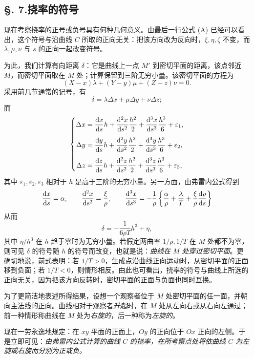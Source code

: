 \subsection*{§. 7.\quad 挠率的符号}
现在考察挠率的正号或负号具有何种几何意义。由最后一行公式 (A) 已经可以看出，这个符号与沿曲线 \(C\) 所取的正向无关：把该方向改为反向时，\(\xi,\eta,\zeta\) 不变，而 \(\lambda,\mu,\nu\) 与 \(s\) 的正向一起改变符号。

为此，我们计算有向距离 \(\delta\)：它是曲线上一点 \(M'\) 到密切平面的距离，该点邻近 \(M\)，而密切平面取在 \(M\) 处；计算保留到三阶无穷小量。该密切平面的方程为
\[
(X-x)\lambda+(Y-y)\mu+(Z-z)\nu=0.
\]
采用前几节通常的记号，有
\[
\delta=\lambda\Delta x+\mu\Delta y+\nu\Delta z;
\]
而
\[
\left\{
\begin{aligned}
\Delta x&=\frac{\mathrm{d} x}{\mathrm{d} s}h+\frac{\mathrm{d}^2x}{\mathrm{d} s^2}\frac{h^2}{2}+\frac{\mathrm{d}^3x}{\mathrm{d} s^3}\frac{h^3}{6}+\varepsilon_1,\\[0.4em]
\Delta y&=\frac{\mathrm{d} y}{\mathrm{d} s}h+\frac{\mathrm{d}^2y}{\mathrm{d} s^2}\frac{h^2}{2}+\frac{\mathrm{d}^3y}{\mathrm{d} s^3}\frac{h^3}{6}+\varepsilon_2,\\[0.4em]
\Delta z&=\frac{\mathrm{d} z}{\mathrm{d} s}h+\frac{\mathrm{d}^2z}{\mathrm{d} s^2}\frac{h^2}{2}+\frac{\mathrm{d}^3z}{\mathrm{d} s^3}\frac{h^3}{6}+\varepsilon_3,
\end{aligned}\right.
\]
其中 \(\varepsilon_1,\varepsilon_2,\varepsilon_3\) 相对于 \(h\) 是高于三阶的无穷小量。另一方面，由弗雷内公式得到
\[
\frac{\mathrm{d} x}{\mathrm{d} s}=\alpha,
\qquad
\frac{\mathrm{d}^2x}{\mathrm{d} s^2}=\frac{\xi}{\rho},
\qquad
\frac{\mathrm{d}^3x}{\mathrm{d} s^3}=-\frac{1}{\rho}\left\{\frac{\alpha}{\rho}+\frac{\lambda}{T}+\frac{\xi}{\rho}\frac{\mathrm{d}\rho}{\mathrm{d} s}\right\}
\]
从而
\[
\delta=-\frac{1}{6\rho T}h^3+\eta,
\]
其中 \(\eta/h^3\) 在 \(h\) 趋于零时为无穷小量。若假定两曲率 \(1/\rho,1/T\) 在 \(M\) 处都不为零，则可见 \(\delta\) 的符号随 \(h\) 的符号而改变，也就是说：\emph{曲线在 \(M\) 处穿过密切平面}。更确切地说，前式表明：若 \(1/T>0\)，生成点沿曲线正向运动时，从密切平面的正面移到负面；若 \(1/T<0\)，则情形相反。由此也可看出，挠率的符号与曲线上所选的正向无关，因为把该方向反转时，密切平面的正面与负面也同时互换。

为了更简洁地表述所得结果，设想一个观察者位于 \(M\) 处密切平面的任一面，并朝向主法线的正向。曲线相对于观察者\emph{升起}时，在 \(M\) 处从左向右或从右向左通过；前一种情形称曲线在 \(M\) 处为\emph{右旋的}，后一种称为\emph{左旋的}。

现在一劳永逸地规定：在 \(xy\) 平面的正面上，\(Oy\) 的正向位于 \(Ox\) 正向的左侧。于是立即可见：\emph{由弗雷内公式计算的曲线 \(C\) 的挠率，在所考察点处将依曲线 \(C\) 为左旋或右旋而分别为正或负。}

